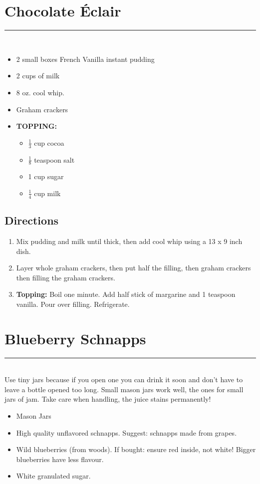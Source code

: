 \documentclass[12pt]{article}
\def \hzline{\noindent \rule[0mm]{\textwidth}{1pt}}
\begin{document}
\section*{Chocolate \'Eclair} \hzline \\
\begin{itemize}
  \item 2 small boxes French Vanilla instant pudding
  \item 2 cups of milk
  \item 8 oz. cool whip.
  \item Graham crackers
  \item \textbf{TOPPING:}
    \begin{itemize}
      \item $\frac{1}{3}$ cup cocoa
      \item $\frac{1}{8}$ teaspoon salt
      \item 1 cup sugar
      \item $\frac{1}{4}$ cup milk
    \end{itemize}
\end{itemize}


\subsection*{Directions}
\begin{enumerate}
 \item Mix pudding and milk until thick, then add cool whip using a 13 x 9 inch dish.
 \item Layer whole graham crackers, then put half the filling, then graham crackers then filling the graham crackers.
 \item \textbf{Topping:} Boil one minute. Add half stick of margarine and 1 teaspoon vanilla. Pour over filling. Refrigerate.
\end{enumerate}





\section*{Blueberry Schnapps} \hzline \\
Use tiny jars because if you open one you can drink it soon and don't have to leave a bottle opened too long. Small mason jars work well, the ones for small jars of jam. Take care when handling, the juice stains permanently!

\begin{itemize}
  \item Mason Jars
  \item High quality unflavored schnapps. Suggest: schnapps made from grapes.
  \item Wild blueberries (from woods). If bought: ensure red inside, not white! 
          Bigger blueberries have less flavour.
  \item White granulated sugar.
\end{itemize}
\end{document}
